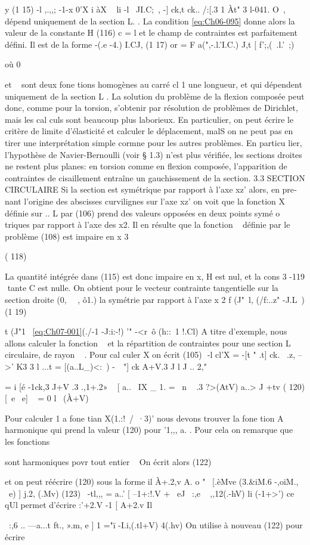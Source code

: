 y
(1 15) -l ,.,,; -1-x 0'X i àX 
~
li -l ~JI.C;~, -] ck,t ck..
/:[.3
1 Àt" 3 l-041. O~, dépend uniquement de la section L. . La condition \eqref{eq:Ch06-095} donne alors la valeur de la constante 
H
(116) 
c = 
l 
et le champ de contraintes est parfaitement défini. Il est de la forme 
-(.e -4.) I.CJ,  
(1 17)  or  =  F  a(",-.l.'I.C.)  
J,t  [  f';,(~.l.'~;)  

où 0{ et ~ sont deux fone tions homogènes au carré cl 1 une longueur, et qui 
dépendent uniquement de la section L . 
La solution du problème de la flexion composée peut donc, comme pour la torsion, s'obtenir par résolution de problèmes de Dirichlet, mais les cal­
culs sont beaucoup plus laborieux. En particulier, on peut écrire le critère de limite d'élasticité et calculer le déplacement, malS on ne peut pas en 
tirer une interprétation simple cormne pour les autres problèmes. En particu­
lier, l'hypothèse de Navier-Bernoulli (voir § 1.3) n'est plus vérifiée, les 
sections droites ne restent plus planes: en torsion comme en flexion composée, l'apparition de contraintes de cisaillement entraîne un gauchissement de la section. 
3.3 SECTION CIRCULAIRE 
Si la section est symétrique par rapport à l'axe xz' alors, en pre­nant l'origine des abscisses curvilignes sur l'axe xz' on voit que la fonction X définie sur .. L par (106) prend des valeurs opposées en deux points symé­
o 
triques par rapport à l'axe des x2. Il en résulte que la fonction ~ définie par le problème (108) est impaire en x
3 

( 118) 


La quantité intégrée dans (115) est donc impaire en x, H est nul, et la cons­
3 
-119 ­
tante C est nulle. On obtient pour le vecteur contrainte tangentielle sur la section droite (0, ~~, ô1.) la symétrie par rapport à l'axe x
2 f (J"~l, (/f:..z" -J.L~)
(1 19) 


t (J"1~ \eqref{eq:Ch07-001}(./-1 -J:i:-!) '" -<r~ô (h::~1 !.Cl) 
A titre d'exemple, nous allons calculer la fonction ~ et la répar­tition de contraintes pour une section L circulaire, de rayon ~ . Pour cal­
culer X on écrit (105)
 
-l
cl'X = -[t " .t] ck. 
~.z, --\+>' K3 3
l 
...t 
= [(a..L_)<:~) -~~"] ck
A+V.3 J
l 
J .. 2," 

= i [é -1ck,3
J+V .3 .,1+.2»
~ [ a..~ IX _
1. = ~n
~ .3 ?>(AtV) 
a..> J +tv
( 120) [~e ~e]
~ = 
0 l ~(À+V) 

Pour calculer 1 a fone tian X(1.:!~/~·3)' nous devons trouver la fone tion A 
harmonique qui prend la valeur (120) pour '1,,, a. . Pour cela on remarque que
 
les fonctions 


sont harmoniques povr tout entier ~ On écrit alors 
(122) 

et on peut réécrire (120) sous la forme 
il À+.2,v
A. o " ~[.èMve (3.&iM.6 -,oiM., ~e) ] j.2, (.Mv)
(123) 
~-tl,,, 
= a..' [ --1+:!.V + ~eJ
~:,e ~ ,,12(.-hV) li (-1+>') 
ce qUl permet d'écrire 
:'+2.V
-1 [ A+2.v Il} ~:,6 .. ---a...t ft., ».m, e ] 1 ="ï -I.i,(.tl+V) 4(.hv) 
On utilise à nouveau (122) pour écrire 

